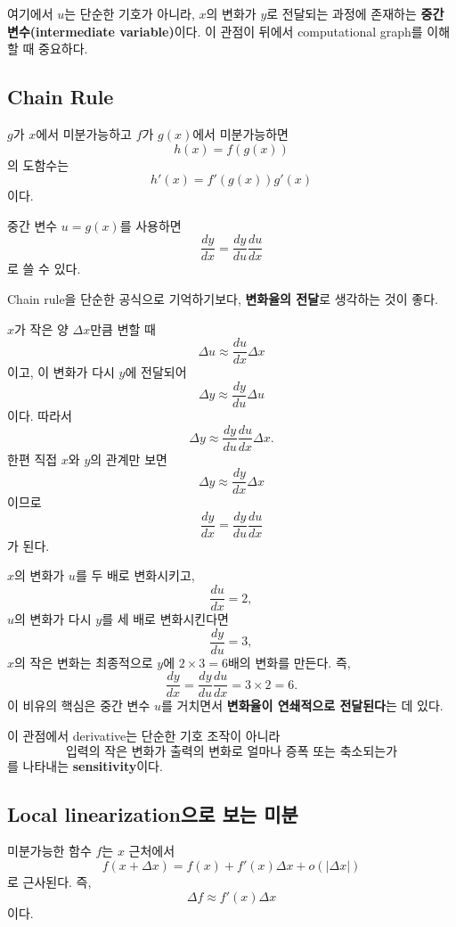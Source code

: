 \documentclass[11pt,a4paper]{article}
\begin{document}
여기에서 $u$는 단순한 기호가 아니라, $x$의 변화가 $y$로 전달되는 과정에 존재하는
\textbf{중간 변수(intermediate variable)}이다. 이 관점이 뒤에서 computational graph를 이해할 때 중요하다.

\subsection{Chain Rule}

$g$가 $x$에서 미분가능하고 $f$가 $g(x)$에서 미분가능하면
\[
h(x)=f(g(x))
\]
의 도함수는
\[
\boxed{
 h'(x)=f'(g(x))g'(x)
}
\]
이다.

중간 변수 $u=g(x)$를 사용하면
\[
\boxed{
\frac{dy}{dx}
=
\frac{dy}{du}\frac{du}{dx}
}
\]
로 쓸 수 있다.

\begin{thinkbox}[왜 ``곱''이 나타나는가?]
Chain rule을 단순한 공식으로 기억하기보다, \textbf{변화율의 전달}로 생각하는 것이 좋다.

$x$가 작은 양 $\Delta x$만큼 변할 때
\[
\Delta u \approx \frac{du}{dx}\Delta x
\]
이고, 이 변화가 다시 $y$에 전달되어
\[
\Delta y \approx \frac{dy}{du}\Delta u
\]
이다. 따라서
\[
\Delta y
\approx
\frac{dy}{du}\frac{du}{dx}\Delta x.
\]
한편 직접 $x$와 $y$의 관계만 보면
\[
\Delta y\approx \frac{dy}{dx}\Delta x
\]
이므로
\[
\frac{dy}{dx}=\frac{dy}{du}\frac{du}{dx}
\]
가 된다.
\end{thinkbox}

\begin{remarkbox}
$x$의 변화가 $u$를 두 배로 변화시키고,
\[
\frac{du}{dx}=2,
\]
$u$의 변화가 다시 $y$를 세 배로 변화시킨다면
\[
\frac{dy}{du}=3,
\]
$x$의 작은 변화는 최종적으로 $y$에 $2\times3=6$배의 변화를 만든다.
즉,
\[
\frac{dy}{dx}=\frac{dy}{du}\frac{du}{dx}=3\times2=6.
\]
이 비유의 핵심은 중간 변수 $u$를 거치면서 \textbf{변화율이 연쇄적으로 전달된다}는 데 있다.
\end{remarkbox}

이 관점에서 derivative는 단순한 기호 조작이 아니라
\[
\boxed{\text{입력의 작은 변화가 출력의 변화로 얼마나 증폭 또는 축소되는가}}
\]
를 나타내는 \textbf{sensitivity}이다.

\subsection{Local linearization으로 보는 미분}

미분가능한 함수 $f$는 $x$ 근처에서
\[
f(x+\Delta x)
=
f(x)+f'(x)\Delta x+o(|\Delta x|)
\]
로 근사된다. 즉,
\[
\boxed{\Delta f\approx f'(x)\Delta x}
\]
이다.
\end{document}
